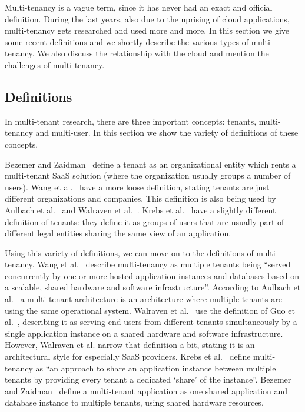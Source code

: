 Multi-tenancy is a vague term, since it has never had an exact and official definition. During the last years, also due to the uprising of cloud applications, multi-tenancy gets researched and used more and more. In this section we give some recent definitions and we shortly describe the various types of multi-tenancy. We also discuss the relationship with the cloud and mention the challenges of multi-tenancy.

\subsection{Definitions}

In multi-tenant research, there are three important concepts: tenants, multi-tenancy and multi-user. In this section we show the variety of definitions of these concepts.

Bezemer and Zaidman~\cite{bezemer2010multi} define a tenant as an organizational entity which rents a multi-tenant \ac{SaaS} solution (where the organization usually groups a number of users). Wang et al.~\cite{wang2008study} have a more loose definition, stating tenants are just different organizations and companies. This definition is also being used by Aulbach et al.~\cite{aulbach2008multi} and Walraven et al.~\cite{walraven2012towards}. Krebs et al.~\cite{krebs2012architecture} have a slightly different definition of tenants: they define it as groups of users that are usually part of different legal entities sharing the same view of an application.

Using this variety of definitions, we can move on to the definitions of multi-tenancy. Wang et al.~\cite{wang2008study} describe multi-tenancy as multiple tenants being ``served concurrently by one or more hosted application instances and databases based on a scalable, shared hardware and software infrastructure''. According to Aulbach et al.~\cite{aulbach2008multi} a multi-tenant architecture is an architecture where multiple tenants are using the same operational system. Walraven et al.~\cite{walraven2012towards} use the definition of Guo et al.~\cite{guo2007framework}, describing it as serving end users from different tenants simultaneously by a single application instance on a shared hardware and software infrastructure. However, Walraven et al. narrow that definition a bit, stating it is an architectural style for especially \ac{SaaS} providers. Krebs et al.~\cite{krebs2012architecture} define multi-tenancy as ``an approach to share an application instance between multiple tenants by providing every tenant a dedicated `share' of the instance''. Bezemer and Zaidman~\cite{bezemer2010multi} define a multi-tenant application as one shared application and database instance to multiple tenants, using shared hardware resources.

